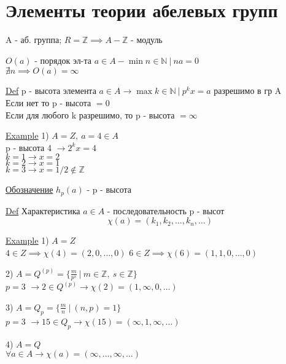 \documentclass[a4paper]{article}
\begin{document}
\section*{\centering Элементы теории абелевых групп}

A - аб. группа; $ R = \mathbb{Z} \implies A - \mathbb{Z} $ - модуль

$ O(a) $ - порядок эл-та $ a \in A - \min n \in \mathbb{N} \ | \ na = 0 $ \\
$ \nexists n \implies O(a) = \infty $ 

\begin{tcolorbox}
\underline{Def} p - высота элемента $ a \in A \to \max k \in \mathbb{N} \ | \
p^{k}x = a$ разрешимо в гр A\\
Если нет то p - высота $ = 0 $ \\
Если для любого k разрешимо, то p - высота $ = \infty $ 

\underline{Example} 1) $ A = Z, \ a = 4 \in A $ \\
p - высота 4 $ \to 2^{k}x = 4 $ \\
$ k = 1 \to x = 2 $ \\
$ k = 2 \to x = 1 $ \\
$ k = 3 \to x = 1/2 \notin \mathbb{Z} $ 

\underline{Обозначение} $ h_p(a) $ - p - высота
\end{tcolorbox}

\begin{tcolorbox}
\underline{Def} Характеристика $ a \in A $ - последовательность p - высот
\[
    \chi(a) = (k_1, k_2, \dots , k_n, \dots)
\]
\end{tcolorbox}

\begin{tcolorbox}
\underline{Example} 1) $ A = Z $\\
$ 4 \in Z \implies \chi(4) = (2, 0, \dots , 0) $ 
$ 6 \in Z \implies \chi(6) = (1, 1, 0, \dots , 0) $ 

2) $ A = Q^{(p)} = \{ \frac{m}{p^{s}}  \ | \ m \in \mathbb{Z}, \ s \in \mathbb{Z} \} $ \\
\underline{$p=3$} $ \to 2 \in Q^{(p)} \to \chi(2) = (1, \infty, 0, \dots ) $ 

3) $ A = Q_{p} = \{ \frac{m}{n}  \ | \ (n,p) = 1 \} $ \\
\underline{$p=3$} $ \to 15 \in Q_{p} \to \chi(15) = (\infty, 1, \infty, \dots ) $ 

4) $ A = Q $\\
$ \forall a \in A \to \chi(a) = (\infty, \dots, \infty, \dots) $ 
\end{tcolorbox}
\end{document}
